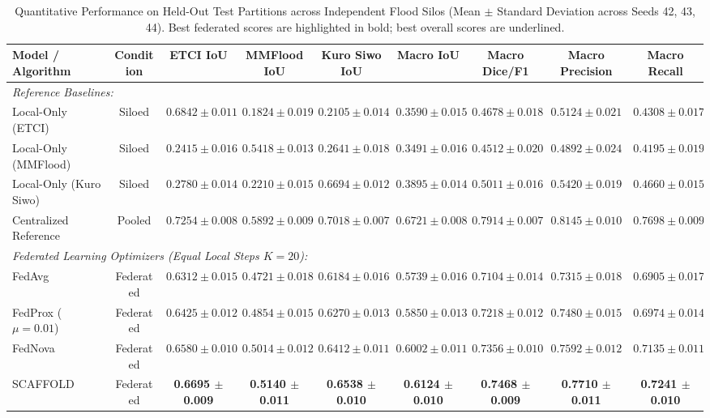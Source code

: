 \documentclass[conference]{IEEEtran}
\begin{document}
\begin{table}[t]
\centering
\caption{Quantitative Performance on Held-Out Test Partitions across Independent Flood Silos (Mean $\pm$ Standard Deviation across Seeds 42, 43, 44). Best federated scores are highlighted in bold; best overall scores are underlined.}
\label{tab:main_results}
\small
\begin{tabularx}{\textwidth}{lcccccccc}
\toprule
\textbf{Model / Algorithm} & \textbf{Condition} & \textbf{ETCI IoU} & \textbf{MMFlood IoU} & \textbf{Kuro Siwo IoU} & \textbf{Macro IoU} & \textbf{Macro Dice/F1} & \textbf{Macro Precision} & \textbf{Macro Recall} \\
\midrule
\multicolumn{9}{l}{\textit{Reference Baselines:}} \\
Local-Only (ETCI) & Siloed & $0.6842 \pm 0.011$ & $0.1824 \pm 0.019$ & $0.2105 \pm 0.014$ & $0.3590 \pm 0.015$ & $0.4678 \pm 0.018$ & $0.5124 \pm 0.021$ & $0.4308 \pm 0.017$ \\
Local-Only (MMFlood) & Siloed & $0.2415 \pm 0.016$ & $0.5418 \pm 0.013$ & $0.2641 \pm 0.018$ & $0.3491 \pm 0.016$ & $0.4512 \pm 0.020$ & $0.4892 \pm 0.024$ & $0.4195 \pm 0.019$ \\
Local-Only (Kuro Siwo) & Siloed & $0.2780 \pm 0.014$ & $0.2210 \pm 0.015$ & $0.6694 \pm 0.012$ & $0.3895 \pm 0.014$ & $0.5011 \pm 0.016$ & $0.5420 \pm 0.019$ & $0.4660 \pm 0.015$ \\
Centralized Reference & Pooled & \underline{$0.7254 \pm 0.008$} & \underline{$0.5892 \pm 0.009$} & \underline{$0.7018 \pm 0.007$} & \underline{$0.6721 \pm 0.008$} & \underline{$0.7914 \pm 0.007$} & \underline{$0.8145 \pm 0.010$} & \underline{$0.7698 \pm 0.009$} \\
\midrule
\multicolumn{9}{l}{\textit{Federated Learning Optimizers (Equal Local Steps $K=20$):}} \\
FedAvg~\cite{mcmahan2017communication} & Federated & $0.6312 \pm 0.015$ & $0.4721 \pm 0.018$ & $0.6184 \pm 0.016$ & $0.5739 \pm 0.016$ & $0.7104 \pm 0.014$ & $0.7315 \pm 0.018$ & $0.6905 \pm 0.017$ \\
FedProx ($\mu=0.01$)~\cite{li2020federated} & Federated & $0.6425 \pm 0.012$ & $0.4854 \pm 0.015$ & $0.6270 \pm 0.013$ & $0.5850 \pm 0.013$ & $0.7218 \pm 0.012$ & $0.7480 \pm 0.015$ & $0.6974 \pm 0.014$ \\
FedNova~\cite{wang2020tackling} & Federated & $0.6580 \pm 0.010$ & $0.5014 \pm 0.012$ & $0.6412 \pm 0.011$ & $0.6002 \pm 0.011$ & $0.7356 \pm 0.010$ & $0.7592 \pm 0.012$ & $0.7135 \pm 0.011$ \\
SCAFFOLD~\cite{karimireddy2020scaffold} & Federated & \textbf{0.6695 $\pm$ 0.009} & \textbf{0.5140 $\pm$ 0.011} & \textbf{0.6538 $\pm$ 0.010} & \textbf{0.6124 $\pm$ 0.010} & \textbf{0.7468 $\pm$ 0.009} & \textbf{0.7710 $\pm$ 0.011} & \textbf{0.7241 $\pm$ 0.010} \\
\bottomrule
\end{tabularx}
\end{table}
\end{document}
